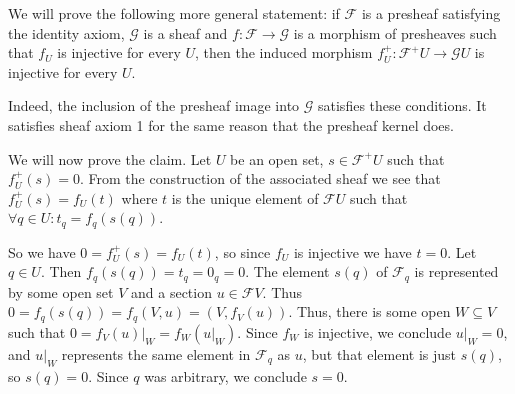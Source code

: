 We will prove the following more general statement: if $\mathcal{F}$ is a presheaf
satisfying the identity axiom, $\mathcal{G}$ is a sheaf and $f\colon \mathcal{F}\to \mathcal{G}$
is a morphism of presheaves such that $f_U$ is injective for every $U$, then the induced
morphism $f^+_U\colon \mathcal{F}^+U\to \mathcal{G}U$ is injective for every $U$.

Indeed, the inclusion of the presheaf image into $\mathcal{G}$ satisfies these conditions.
It satisfies sheaf axiom 1 for the same reason that the presheaf kernel does.

We will now prove the claim. Let $U$ be an open set, $s \in \mathcal{F}^+U$ such that
$f^+_U(s) = 0$. From the construction of the associated sheaf we see that
$f^+_U(s) = f_U(t)$ where $t$ is the unique element of $\mathcal{F}U$ such that
$\forall q \in U\colon t_q = f_q(s(q))$.

So we have $0 = f^+_U(s) = f_U(t)$, so since $f_U$ is injective we have $t = 0$.
Let $q \in U$. Then $f_q(s(q)) = t_q = 0_q = 0$. The element $s(q)$ of $\mathcal{F}_q$
is represented by some open set $V$ and a section $u \in \mathcal{F}V$. Thus
$0 = f_q(s(q)) = f_q(V, u) = (V, f_V(u))$. Thus, there is some open $W \subseteq V$
such that $0 = f_V(u)|_W = f_W(u|_W)$. Since $f_W$ is injective, we conclude
$u|_W = 0$, and $u|_W$ represents the same element in $\mathcal{F}_q$ as $u$,
but that element is just $s(q)$, so $s(q) = 0$. Since $q$ was arbitrary, we
conclude $s = 0$.
